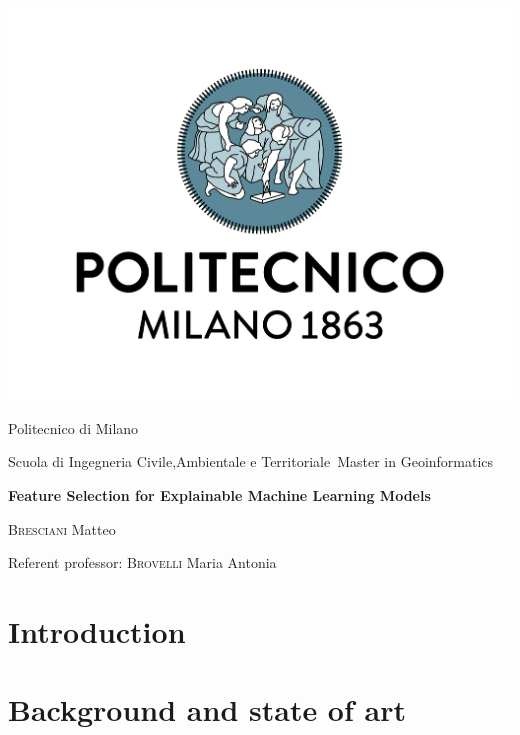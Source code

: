 \documentclass[fontsize=14pt,paper=a4,pagesize=auto]{report}
\begin{document}
\begin{titlepage}
	\centering
	\includegraphics[scale = 0.20]{images/polimi.jpg}\par
	{\Large
		Politecnico di Milano\par
		Scuola di Ingegneria Civile,Ambientale e Territoriale\
		Master in Geoinformatics\par}
			\vspace{0.5cm}
	{\huge\bfseries
		Feature Selection for Explainable Machine Learning Models\\\par}
	\vspace{1cm}
	{\Large
		{\scshape Bresciani} Matteo\par}
	\vfill
	Referent professor: {\scshape Brovelli} Maria Antonia\par
	\vfill
\end{titlepage}




\begin{abstract}


\end{abstract}
\tableofcontents

\chapter{Introduction}
 

\chapter{Background and state of art}
\label{chap:background}

\end{document}
